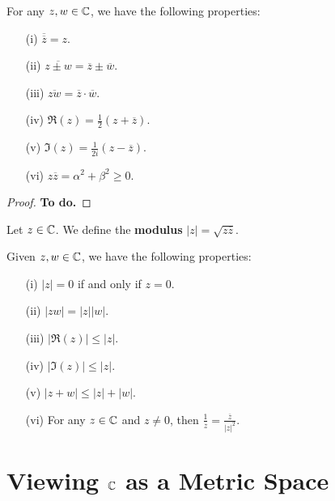 \documentclass[a4paper]{report}
\begin{document}
\begin{prop}
    For any \( z,w \in \mathbb{C}  \), we have the following properties:
   \begin{enumerate}
       \item[(i)] \( \overline{\overline{z}} = z  \).
        \item[(ii)] \( \overline{z \pm w} = \overline{z} \pm \overline{w} \). 
        \item[(iii)] \( \overline{zw} = \overline{z} \cdot \overline{w} \).
        \item[(iv)] \( \Re(z) = \frac{ 1 }{ 2 }  ( z + \overline{z}) \).
        \item[(v)] \( \Im(z) = \frac{ 1 }{ 2i } (z - \overline{z}) \). 
        \item[(vi)] \( z \overline{z} = \alpha^{2} + \beta^{2} \geq 0 \).
   \end{enumerate} 
\end{prop}
\begin{proof}
\textbf{To do.}
\end{proof}

\begin{definition}
   Let \( z \in \mathbb{C}  \). We define the \textbf{modulus} \( | z  |  = \sqrt{ z \overline{z} }  \).
\end{definition}


\begin{prop}
   Given \( z,w \in \mathbb{C}  \), we have the following properties:
   \begin{enumerate}
       \item[(i)] \( | z  |  = 0  \) if and only if \( z = 0  \).
        \item[(ii)] \( | zw  |  = | z  | | w |  \).
        \item[(iii)] \( | \Re(z) |  \leq | z  |  \).
        \item[(iv)] \( | \Im(z) | \leq | z |  \).
        \item[(v)] \( | z + w  | \leq | z  |  + | w |  \).
        \item[(vi)] For any \( z \in \mathbb{C}  \) and \( z \neq 0  \), then
            \(  \frac{ 1 }{ z }  = \frac{ \overline{z} }{ | z |^{2} }. \)
   \end{enumerate}
\end{prop}

\section{Viewing \( \mathbb{C}  \) as a Metric Space}
\end{document}
